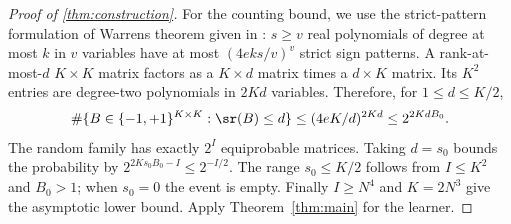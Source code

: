 \begin{proof}[Proof of \cref{thm:construction}]
For the counting bound, we use the strict-pattern formulation of Warren\textquotesingle s theorem \citep{Warren68} given in \citet[Theorem 21 and Lemma 22]{AMY16}: $s\ge v$ real polynomials of degree at most $k$ in $v$ variables have at most $(4eks/v)^v$ strict sign patterns. A rank-at-most-$d$ $K\times K$ matrix factors as a $K\times d$ matrix times a $d\times K$ matrix. Its $K^2$ entries are degree-two polynomials in $2Kd$ variables. Therefore, for $1\le d\le K/2$,
\begin{equation}\label{eq:warren}
 \#\{B\in\{-1,+1\}^{K\times K}:\sr(B)\le d\}
 \le(4eK/d)^{2Kd}\le2^{2KdB_0}.
\end{equation}
The random family has exactly $2^I$ equiprobable matrices. Taking $d=s_0$ bounds the probability by $2^{2Ks_0B_0-I}\le2^{-I/2}$. The range $s_0\le K/2$ follows from $I\le K^2$ and $B_0>1$; when $s_0=0$ the event is empty. Finally $I\ge N^4$ and $K=2N^3$ give the asymptotic lower bound. Apply Theorem~\ref{thm:main} for the learner.
\end{proof}
